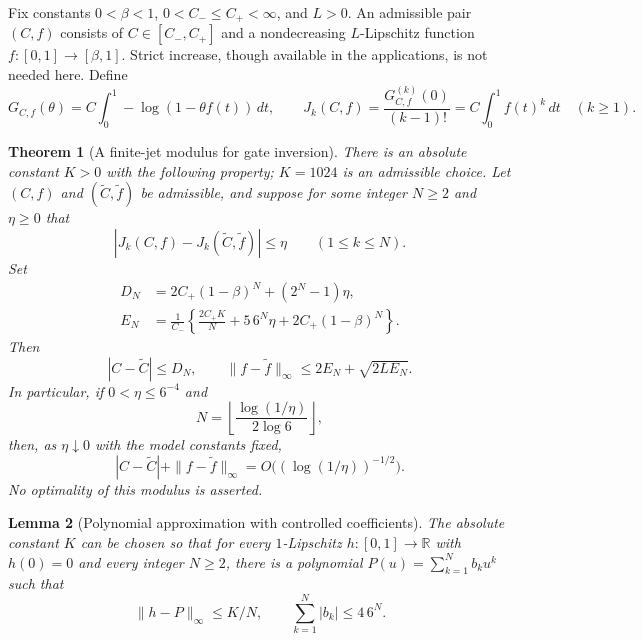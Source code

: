 \documentclass[11pt,letterpaper]{article}
\newtheorem{theorem}{Theorem}[section]
\newtheorem{lemma}[theorem]{Lemma}
\theoremstyle{definition}
\theoremstyle{remark}
\newcommand{\1}{\mathbf 1}
\begin{document}
Fix constants $0<\beta<1$, $0<C_-\leq C_+<\infty$, and $L>0$.
An admissible pair $(C,f)$ consists of $C\in[C_-,C_+]$ and a
nondecreasing $L$-Lipschitz function $f:[0,1]\to[\beta,1]$.  Strict
increase, though available in the applications, is not needed here.  Define
\begin{equation}\label{p08:eq:finite-gate-J}
 G_{C,f}(\theta)=C\int_0^1-\log(1-\theta f(t))\,dt,\qquad
 J_k(C,f)=\frac{G_{C,f}^{(k)}(0)}{(k-1)!}
 =C\int_0^1 f(t)^k\,dt\quad(k\geq1).
\end{equation}

\begin{theorem}[A finite-jet modulus for gate inversion]
\label{p08:thm:finite-gate-modulus}
There is an absolute constant $K>0$ with the following property;
$K=1024$ is an admissible choice.
Let $(C,f)$ and $(\widetilde C,\widetilde f)$ be admissible, and suppose
for some integer $N\geq2$ and $\eta\geq0$ that
\begin{equation}\label{p08:eq:gate-jet-noise}
 |J_k(C,f)-J_k(\widetilde C,\widetilde f)|\leq\eta
 \qquad(1\leq k\leq N).
\end{equation}
Set
\begin{align}
 D_N&=2C_+(1-\beta)^N+(2^N-1)\eta,\label{p08:eq:gate-DN}\\
 E_N&=\frac{1}{C_-}\left\{
 \frac{2C_+K}{N}+5\,6^N\eta+2C_+(1-\beta)^N\right\}.
 \label{p08:eq:gate-EN}
\end{align}
Then
\begin{equation}\label{p08:eq:gate-profile-modulus}
 |C-\widetilde C|\leq D_N,\qquad
 \|f-\widetilde f\|_\infty
 \leq 2E_N+\sqrt{2LE_N}.
\end{equation}
In particular, if $0<\eta\leq6^{-4}$ and
\begin{equation}\label{p08:eq:gate-Nchoice}
 N=\left\lfloor\frac{\log(1/\eta)}{2\log6}\right\rfloor,
\end{equation}
then, as $\eta\downarrow0$ with the model constants fixed,
\begin{equation}\label{p08:eq:gate-log-rate}
 |C-\widetilde C|+\|f-\widetilde f\|_\infty
 =O\big((\log(1/\eta))^{-1/2}\big).
\end{equation}
No optimality of this modulus is asserted.
\end{theorem}

\begin{lemma}[Polynomial approximation with controlled coefficients]
\label{p08:lem:gate-polynomial-approx}
The absolute constant $K$ can be chosen so that for every $1$-Lipschitz
$h:[0,1]\to\mathbb R$ with $h(0)=0$ and every integer $N\geq2$, there
is a polynomial $P(u)=\sum_{k=1}^N b_k u^k$ such that
\begin{equation}\label{p08:eq:gate-polynomial-bounds}
 \|h-P\|_\infty\leq K/N,\qquad
 \sum_{k=1}^N|b_k|\leq4\,6^N.
\end{equation}
\end{lemma}
\end{document}
